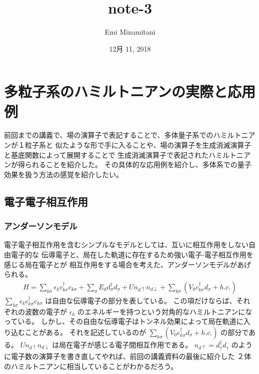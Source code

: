 \documentclass[letterpaper,10pt,dvipdfmx]{sphinxhowto}
\title{note-3}
\date{12月 11, 2018}
\author{Emi Minamitani}
\begin{document}
\maketitle
\sphinxtableofcontents
{}\label{\detokenize{index::doc}}



\section{多粒子系のハミルトニアンの実際と応用例}
\label{\detokenize{index:id1}}\label{\detokenize{index:id2}}
前回までの講義で、場の演算子で表記することで、多体量子系でのハミルトニアンが１粒子系と
似たような形で手に入ることや、場の演算子を生成消滅演算子と基底関数によって展開することで
生成消滅演算子で表記されたハミルトニアンが得られることを紹介した。
その具体的な応用例を紹介し、多体系での量子効果を扱う方法の感覚を紹介したい。


\subsection{電子電子相互作用}
\label{\detokenize{index:id3}}

\subsubsection{アンダーソンモデル}
\label{\detokenize{index:id4}}
電子電子相互作用を含むシンプルなモデルとしては、互いに相互作用をしない自由電子的な
伝導電子と、局在した軌道に存在するため強い電子-電子相互作用を感じる局在電子とが
相互作用をする場合を考えた、アンダーソンモデルがあげられる。
\begin{equation*}
\begin{split}H=\sum_{k\sigma} \epsilon_k c_{k\sigma}^\dagger c_{k\sigma}+\sum_{\sigma}E_d d_{\sigma}^\dagger
d_{\sigma} +Un_{d\uparrow}n_{d\downarrow} +\sum_{k\sigma}(V_{0}
c_{k\sigma}^\dagger d_{\sigma} + h.c.)\end{split}
\end{equation*}
\(\sum_{k\sigma} \epsilon_k c_{k\sigma}^\dagger c_{k\sigma}\)
は自由な伝導電子の部分を表している。
この項だけならば、それぞれの波数の電子が
\(\epsilon_k\)
のエネルギーを持つという対角的なハミルトニアンになっている。
しかし、その自由な伝導電子はトンネル効果によって局在軌道に入り込むことがある。
それを記述しているのが
\(\sum_{k\sigma}(V_{0} c_{k\sigma}^\dagger d_{\sigma} + h.c.)\)
の部分である。
\(Un_{d\uparrow}n_{d\downarrow}\)
は局在電子が感じる電子間相互作用である。
\(n_{d\uparrow}=d^\dagger_\uparrow d_\uparrow\)
のように電子数の演算子を書き直してやれば、前回の講義資料の最後に紹介した
２体のハミルトニアンに相当していることがわかるだろう。
\end{document}
